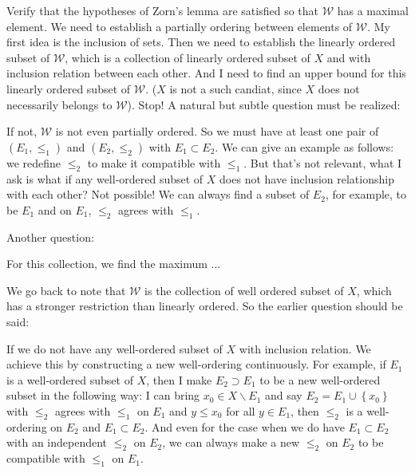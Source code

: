 Verify that the hypotheses of Zorn's lemma are satisfied so that $\mathcal{W}$ has a maximal element. We need to establish a partially ordering between elements of $\mathcal{W}$. My first idea is the inclusion of sets. Then we need to establish the linearly ordered subset of $\mathcal{W}$, which is a collection of linearly ordered subset of $X$ and with inclusion relation between each other. And I need to find an upper bound for this linearly ordered subset of $\mathcal{W}$. ($X$ is not a such candiat, since $X$ does not necessarily belongs to $\mathcal{W}$). Stop! A natural but subtle question must be realized: 

\kh
{}
\kh

If not, $\mathcal{W}$ is not even partially ordered. So we must have at least one pair of $(E_1,\le_1)$ and $(E_2,\le_2)$ with $E_1\subset E_2$. We can give an example as follows: we redefine $\le_2$ to make it compatible with $\le_1$. But that's not relevant, what I ask is what if any well-ordered subset of $X$ does not have inclusion relationship with each other? Not possible! We can always find a subset of $E_2$, for example, to be $E_1$ and on $E_1$, $\le_2$ agrees with $\le_1$.

Another question: 

\kh 
{}
\kh

For this collection, we find the maximum ...

We go back to note that $\mathcal{W}$ is the collection of well ordered subset of $X$, which has a stronger restriction than linearly ordered. So the earlier question should be said:

\kh
{}
\kh

If we do not have any well-ordered subset of $X$ with inclusion relation. We achieve this by constructing a new well-ordering continuously. For example, if $E_1$ is a well-ordered subset of $X$, then I make $E_2\supset E_1$ to be a new well-ordered subset in the following way: I can bring $x_0\in X\backslash E_1$ and say $E_2=E_1\cup\left\{x_0\right\}$ with $\le_2$ agrees with $\le_1$ on $E_1$ and $y\le x_0$ for all $y\in E_1$, then $\le_2$ is a well-ordering on $E_2$ and $E_1\subset E_2$. And even for the case when we do have $E_1\subset E_2$ with an independent $\le_2$ on $E_2$, we can always make a new $\le_2$ on $E_2$ to be compatible with $\le_1$ on $E_1$.

